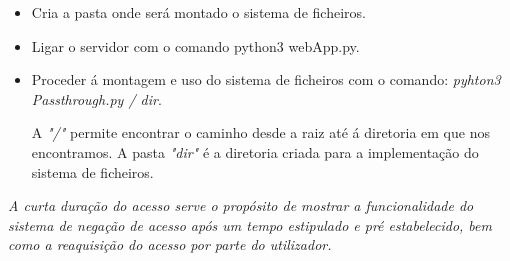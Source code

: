 \begin{itemize}
\item Cria a pasta onde será montado o sistema de ficheiros.\newline
\item Ligar o servidor com o comando python3 webApp.py.\newline
\item Proceder á montagem e uso do sistema de ficheiros com o comando: \textit{pyhton3 Passthrough.py / dir}.\newline


A \textit{"/"} permite encontrar o caminho desde a raiz até á diretoria em que nos encontramos.\newline
A pasta \textit{"dir"} é a diretoria criada para a implementação do sistema de ficheiros.\newline
\end{itemize}

\textit{ A curta duração do acesso serve o propósito de mostrar a funcionalidade do sistema de negação de acesso após um tempo estipulado e pré estabelecido, bem como a reaquisição do acesso por parte do utilizador.} 








